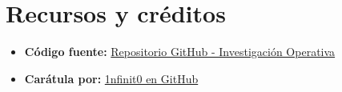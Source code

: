 \documentclass[12pt]{article}
\begin{document}
\newpage
\section*{Recursos y créditos}

\begin{itemize}
    \item \textbf{Código fuente:} \href{https://github.com/MateoTVara/UTP/blob/main/docs/C8/Investigacion_Operativa/S12-Evaluacion/evaluacion.pdf}{Repositorio GitHub - Investigación Operativa}
    \item \textbf{Carátula por:} \href{https://github.com/1nfinit0}{1nfinit0 en GitHub}
\end{itemize}
\end{document}
